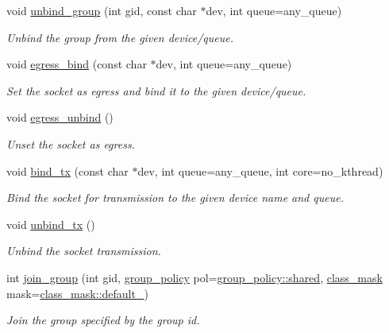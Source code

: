 \begin{DoxyCompactItemize}
void \hyperlink{classpfq_1_1socket_a6e1f7ee7f44b6824d734d4ff7046d907}{unbind\+\_\+group} (int gid, const char $\ast$dev, int queue=any\+\_\+queue)
\begin{DoxyCompactList}\small\item\em Unbind the group from the given device/queue. \end{DoxyCompactList}\item 
void \hyperlink{classpfq_1_1socket_a2c96741054ea764f5d8c31295ef5df29}{egress\+\_\+bind} (const char $\ast$dev, int queue=any\+\_\+queue)
\begin{DoxyCompactList}\small\item\em Set the socket as egress and bind it to the given device/queue. \end{DoxyCompactList}\item 
void \hyperlink{classpfq_1_1socket_ae80718e8f26cdaed3fd05bfde6d835e0}{egress\+\_\+unbind} ()
\begin{DoxyCompactList}\small\item\em Unset the socket as egress. \end{DoxyCompactList}\item 
void \hyperlink{classpfq_1_1socket_ae1a9ad5e1d5ad478a1a642f29f49e9c0}{bind\+\_\+tx} (const char $\ast$dev, int queue=any\+\_\+queue, int core=no\+\_\+kthread)
\begin{DoxyCompactList}\small\item\em Bind the socket for transmission to the given device name and queue. \end{DoxyCompactList}\item 
void \hyperlink{classpfq_1_1socket_a99ee5e145ccf3a043b3c2aacb3df30cc}{unbind\+\_\+tx} ()
\begin{DoxyCompactList}\small\item\em Unbind the socket transmission. \end{DoxyCompactList}\item 
int \hyperlink{classpfq_1_1socket_afbd75341794fae964ed23ce5858fd153}{join\+\_\+group} (int gid, \hyperlink{namespacepfq_ac41249c8510558905b01fa4d866a38d7}{group\+\_\+policy} pol=\hyperlink{namespacepfq_ac41249c8510558905b01fa4d866a38d7a9e81e7b963c71363e2fb3eefcfecfc0e}{group\+\_\+policy\+::shared}, \hyperlink{namespacepfq_a96af1f5ed530eff563eb917516758fbb}{class\+\_\+mask} mask=\hyperlink{namespacepfq_a96af1f5ed530eff563eb917516758fbba172b03053216c6158fe380805998ad6c}{class\+\_\+mask\+::default\+\_\+})
\begin{DoxyCompactList}\small\item\em Join the group specified by the group id. \end{DoxyCompactList}\item 

\end{DoxyCompactItemize}
